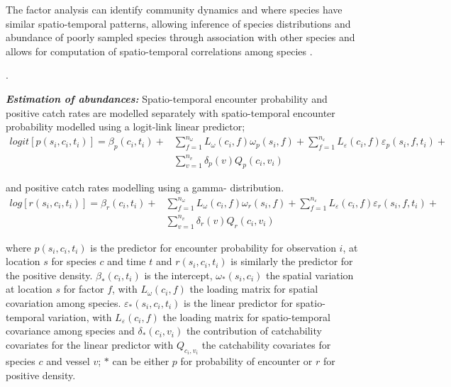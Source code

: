 \documentclass{nature}
\begin{document}
\begin{linenumbers}
The factor analysis can identify community dynamics and where species have
similar spatio-temporal patterns, allowing inference of species distributions
and abundance of poorly sampled species through association with other species
and allows for computation of spatio-temporal correlations among species
\cite{Thorson2016b}.

. 

\textbf{\textit{Estimation of abundances:}} Spatio-temporal encounter
probability and positive catch rates are modelled separately with
spatio-temporal encounter probability modelled using a logit-link linear
predictor;
		\begin{equation}
			\begin{split}
			logit[p(s_{i},c_{i},t_{i})] =	\beta_{p}(c_{i},t_{i}) +
			& \sum\limits_{f=1}^{n_{\omega}} L_{\omega}(c_{i},f)
			\omega_{p}(s_{i},f) + \sum\limits_{f=1}^{n_{\varepsilon}}
			L_{\varepsilon}(c_{i},f) \varepsilon_{p}(s_{i},f,t_{i}) + \\ 
			& \sum\limits_{v=1}^{n_{v}}\delta_{p}(v)Q_{p}(c_{i}, v_{i})
		\end{split}
		\end{equation}

and positive catch rates modelling using a gamma- distribution\cite{Thorson2015a}. 
		\begin{equation}
			\begin{split}
			log[r(s_{i},c_{i},t_{i})] = \beta_{r}(c_{i},t_{i}) +
			& \sum\limits_{f=1}^{n_{\omega}} L_{\omega}(c_{i},f)
			\omega_{r}(s_{i},f) +\sum\limits_{f=1}^{n_{\varepsilon}} 
			L_{\varepsilon}(c_{i},f) \varepsilon_{r}(s_{i},f,t_{i}) + \\
			& \sum\limits_{v=1}^{n_{v}}\delta_{r}(v) Q_{r}(c_{i}, v_{i})
			\end{split}
		\end{equation}

where $p(s_{i}, c_{i}, t_{i})$ is the predictor for encounter probability for
observation $i$, at location $s$ for species $c$ and time $t$ and $r(s_{i},
c_{i}, t_{i})$ is similarly the predictor for the positive density.
$\beta_{*}(c_{i},t_{i})$ is the intercept, $\omega_{*}(s_{i},c_{i})$ the
spatial variation at location $s$ for factor $f$, with $L_{\omega}(c_{i},f)$
the loading matrix for spatial covariation among species.
$\varepsilon_{*}(s_{i},c_{i},t_{i})$ is the linear predictor for
spatio-temporal variation, with $L_{\varepsilon}(c_{i}, f)$ the loading matrix
for spatio-temporal covariance among species and $\delta_{*}(c_{i}, v_{i})$ the
contribution of catchability covariates for the linear predictor with
$Q_{c_{i}, v_{i}}$ the catchability covariates for species $c$ and vessel $v$;
$*$ can be either $p$ for probability of encounter or $r$ for positive density.


\end{linenumbers}
\end{document}
